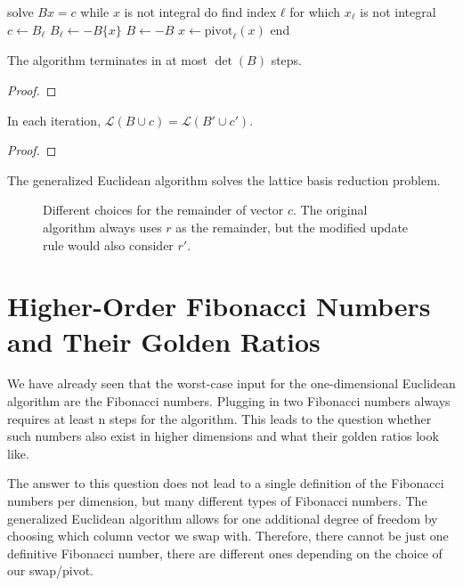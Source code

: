 \begin{Pseudocode}[float=tb, caption={The Modified Algorithm.}, label={lst:modified-generalized-euclidean}]
solve $Bx = c$
while $x$ is not integral do
  find index $ℓ$ for which $x_ℓ$ is not integral
  $c ← B_ℓ$
  $B_ℓ ← -B\{x\}$
  $B ← -B$
  $x ← \mathrm{pivot}_ℓ(x)$
end
\end{Pseudocode}

\begin{lemma}
  The algorithm terminates in at most $\det(B)$ steps.
\end{lemma}

\begin{proof}

\end{proof}

\begin{lemma}
  In each iteration, $\mathcal L(B ∪ c) = \mathcal L(B' ∪ c')$.
\end{lemma}

\begin{proof}

\end{proof}

\begin{theorem}
  The generalized Euclidean algorithm solves the lattice basis reduction problem.
\end{theorem}

\begin{figure}[t]
  \centering
  
  \caption{
    Different choices for the remainder of vector $c$. The original algorithm
    always uses $r$ as the remainder, but the modified update rule would also consider $r'$.}
\end{figure}

\section{Higher-Order Fibonacci Numbers and Their Golden Ratios}

We have already seen that the worst-case input for the one-dimensional
Euclidean algorithm are the Fibonacci numbers.
Plugging in two Fibonacci numbers always requires at least n steps for the
algorithm.
This leads to the question whether such numbers also exist in higher dimensions
and what their golden ratios look like.


The answer to this question does not lead to a single definition of the
Fibonacci numbers per dimension, but many different types of Fibonacci numbers.
The generalized Euclidean algorithm allows for one additional degree of freedom
by choosing which column vector we swap with.
Therefore, there cannot be just one definitive Fibonacci number, there are
different ones depending on the choice of our swap/pivot.

